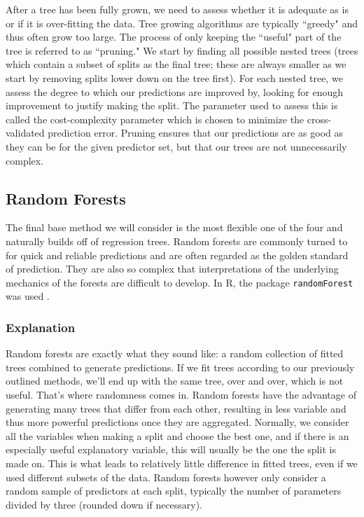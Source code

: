 \documentclass[12pt]{article}\usepackage[]{graphicx}\usepackage[]{color}
\begin{document}
\newpage
After a tree has been fully grown, we need to assess whether it is adequate as is or if it is over-fitting the data. Tree growing algorithms are typically ``greedy" and thus often grow too large. The process of only keeping the ``useful" part of the tree is referred to as ``pruning." We start by finding all possible nested trees (trees which contain a subset of splits as the final tree; these are always smaller as we start by removing splits lower down on the tree first). For each nested tree, we assess the degree to which our predictions are improved by, looking for enough improvement to justify making the split. The parameter used to assess this is called the cost-complexity parameter which is chosen to minimize the cross-validated prediction error. Pruning ensures that our predictions are as good as they can be for the given predictor set, but that our trees are not unnecessarily complex.

\subsection{Random Forests}
The final base method we will consider is the most flexible one of the four and naturally builds off of regression trees. Random forests are commonly turned to for quick and reliable predictions and are often regarded as the golden standard of prediction. They are also so complex that interpretations of the underlying mechanics of the forests are difficult to develop. In R, the package \texttt{randomForest} was used \cite{randomForest}.

\subsubsection{Explanation}
Random forests are exactly what they sound like: a random collection of fitted trees combined to generate predictions. If we fit trees according to our previously outlined methods, we'll end up with the same tree, over and over, which is not useful. That's where randomness comes in. Random forests have the advantage of generating many trees that differ from each other, resulting in less variable and thus more powerful predictions once they are aggregated. Normally, we consider all the variables when making a split and choose the best one, and if there is an especially useful explanatory variable, this will usually be the one the split is made on. This is what leads to relatively little difference in fitted trees, even if we used different subsets of the data. Random forests however only consider a random sample of predictors at each split, typically the number of parameters divided by three (rounded down if necessary). 
\end{document}
